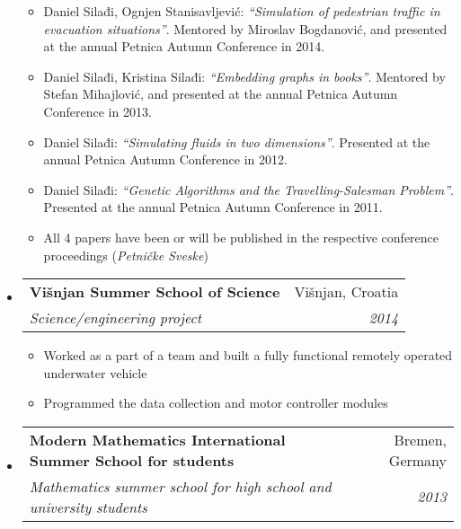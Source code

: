 \documentclass[a4paper]{article}
\makeatletter
\newcommand{\ressubheading}[4]{
\begin{tabular*}{6.5in}{l@{\cftdotfill{\cftsecdotsep}\extracolsep{\fill}}r}
		\textbf{#1} & #2 \\
		\textit{#3} & \textit{#4} \\
\end{tabular*}\vspace{-2pt}}
\makeatother
\begin{document}
\begin{itemize}
\begin{itemize}
		\item Daniel Silađi, Ognjen Stanisavljević: \emph{``Simulation of pedestrian traffic in evacuation situations''}. Mentored by Miroslav Bogdanović, and presented at the annual Petnica Autumn Conference in 2014.
		\item Daniel Silađi, Kristina Silađi: \emph{``Embedding graphs in books''}. Mentored by Stefan Mihajlović, and presented at the annual Petnica Autumn Conference in 2013.
		\item Daniel Silađi: \emph{``Simulating fluids in two dimensions''}. Presented at the annual Petnica Autumn Conference in 2012.
		\item Daniel Silađi: \emph{``Genetic Algorithms and the Travelling-Salesman Problem''}. Presented at the annual Petnica Autumn Conference in 2011.
		\item All 4 papers have been or will be published in the respective conference proceedings (\emph{Petničke Sveske})
	\end{itemize}
	\item \ressubheading{Višnjan Summer School of Science}{Višnjan, Croatia}{Science/engineering project}{2014}
	\begin{itemize}
		\item Worked as a part of a team and built a fully functional remotely operated underwater vehicle
		\item Programmed the data collection and motor controller modules 
	\end{itemize}
	\item \ressubheading{Modern Mathematics International Summer School for students}{Bremen, Germany}{Mathematics summer school for high school and university students}{2013}
\end{itemize}
\end{document}
